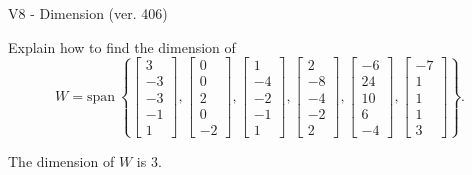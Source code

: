\begin{exercise}
  \begin{exerciseTitle}V8 - Dimension (ver. 406)\end{exerciseTitle}
  \begin{exerciseStatement}
    Explain how to find the dimension of 
\[W=\mathrm{span}\ \left\{\left[\begin{array}{r}
3 \\
-3 \\
-3 \\
-1 \\
1
\end{array}\right] , \left[\begin{array}{r}
0 \\
0 \\
2 \\
0 \\
-2
\end{array}\right] , \left[\begin{array}{r}
1 \\
-4 \\
-2 \\
-1 \\
1
\end{array}\right] , \left[\begin{array}{r}
2 \\
-8 \\
-4 \\
-2 \\
2
\end{array}\right] , \left[\begin{array}{r}
-6 \\
24 \\
10 \\
6 \\
-4
\end{array}\right] , \left[\begin{array}{r}
-7 \\
1 \\
1 \\
1 \\
3
\end{array}\right]\right\}.\]



  \end{exerciseStatement}
  \begin{exerciseAnswer}
   The dimension of \(W\) is  \(3\).
  


  \end{exerciseAnswer}
\end{exercise}